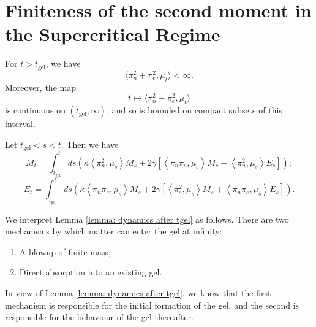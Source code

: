 \section{Finiteness of the second moment in the Supercritical Regime}

\begin{theorem}\label{lemma: second moment finite after tgel} For $t>t_\text{gel}$, we have \begin{equation}
    \langle \pi_n^2+\pi_e^2, \mu_t\rangle <\infty.
\end{equation} Moreover, the map \begin{equation}
    t\mapsto \langle \pi_n^2+\pi_e^2, \mu_t \rangle
\end{equation} is continuous on $(t_\text{gel},\infty)$, and so is bounded on compact subsets of this interval. \end{theorem}
\begin{lemma}\label{lemma: dynamics after tgel} Let $t_\text{gel}<s<t$. Then we have \begin{equation}
    M_t=\int_{t_\text{gel}}^t ds
    \left(
      \kappa \left<\pi_n^2,\mu_s\right>M_s +
      2\gamma \left[
        \left<\pi_n \pi_e,\mu_s \right>M_s +
        \left<\pi_n^2,\mu_s \right>E_s \right]
    \right);
\end{equation}
\begin{equation}
    E_t=\int_{t_\text{gel}}^t ds
    \left(
      \kappa \left<\pi_n \pi_e,\mu_s\right>M_s +
      2\gamma \left[
        \left<\pi_e^2,\mu_s \right>M_s +
        \left<\pi_n \pi_e,\mu_s \right>E_s \right]
    \right).
\end{equation}\end{lemma} \begin{remark} We interpret Lemma \ref{lemma: dynamics after tgel} as follows. There are two mechanisms by which matter can enter the gel at infinity: \begin{enumerate}[label=\roman{*}).]
    \item A blowup of finite mass;
    \item Direct absorption into an existing gel.
\end{enumerate} In view of Lemma \ref{lemma: dynamics after tgel}, we know that the first mechanism is responsible for the initial formation of the gel, and the second is responsible for the behaviour of the gel thereafter.  \end{remark}
